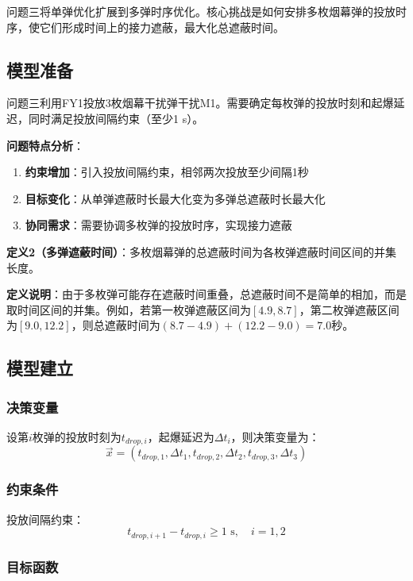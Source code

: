 \documentclass[12pt,a4paper]{article}
\begin{document}
问题三将单弹优化扩展到多弹时序优化。核心挑战是如何安排多枚烟幕弹的投放时序，使它们形成时间上的接力遮蔽，最大化总遮蔽时间。

\subsection{模型准备}

问题三利用FY1投放3枚烟幕干扰弹干扰M1。需要确定每枚弹的投放时刻和起爆延迟，同时满足投放间隔约束（至少1 s）。

\textbf{问题特点分析}：
\begin{enumerate}
    \item \textbf{约束增加}：引入投放间隔约束，相邻两次投放至少间隔1秒
    \item \textbf{目标变化}：从单弹遮蔽时长最大化变为多弹总遮蔽时长最大化
    \item \textbf{协同需求}：需要协调多枚弹的投放时序，实现接力遮蔽
\end{enumerate}

\textbf{定义2（多弹遮蔽时间）}：多枚烟幕弹的总遮蔽时间为各枚弹遮蔽时间区间的并集长度。

\textbf{定义说明}：由于多枚弹可能存在遮蔽时间重叠，总遮蔽时间不是简单的相加，而是取时间区间的并集。例如，若第一枚弹遮蔽区间为$[4.9, 8.7]$，第二枚弹遮蔽区间为$[9.0, 12.2]$，则总遮蔽时间为$(8.7-4.9) + (12.2-9.0) = 7.0$秒。

\subsection{模型建立}

\subsubsection{决策变量}

设第$i$枚弹的投放时刻为$t_{drop,i}$，起爆延迟为$\Delta t_i$，则决策变量为：
$$\vec{x} = (t_{drop,1}, \Delta t_1, t_{drop,2}, \Delta t_2, t_{drop,3}, \Delta t_3)$$

\subsubsection{约束条件}

投放间隔约束：
$$t_{drop,i+1} - t_{drop,i} \geq 1 \text{ s}, \quad i = 1, 2$$

\subsubsection{目标函数}
\end{document}
